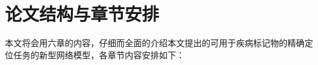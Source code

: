 



\vspace{-1cm}
\section{论文结构与章节安排}\label{sec:arrangement}
本文将会用六章的内容，仔细而全面的介绍本文提出的可用于疾病标记物的精确定位任务的新型网络模型，各章节内容安排如下：

